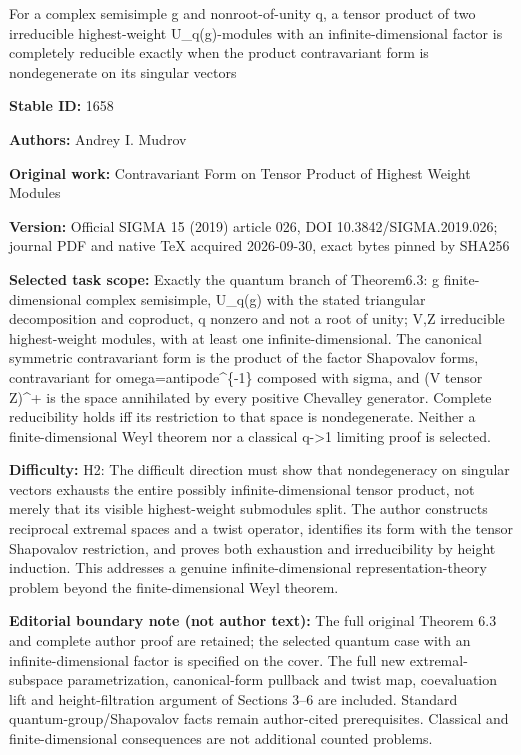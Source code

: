 \documentclass[11pt]{article}
\numberwithin{equation}{section}
\begin{document}
\begin{center}\Large For a complex semisimple g and nonroot-of-unity q, a tensor product of two irreducible highest-weight U\_q(g)-modules with an infinite-dimensional factor is completely reducible exactly when the product contravariant form is nondegenerate on its singular vectors\end{center}
\noindent\textbf{Stable ID:} 1658\par
\noindent\textbf{Authors:} Andrey I. Mudrov\par
\noindent\textbf{Original work:} Contravariant Form on Tensor Product of Highest Weight Modules\par
\noindent\textbf{Version:} Official SIGMA 15 (2019) article 026, DOI 10.3842/SIGMA.2019.026; journal PDF and native TeX acquired 2026-09-30, exact bytes pinned by SHA256\par
\noindent\textbf{Selected task scope:} Exactly the quantum branch of Theorem6.3: g finite-dimensional complex semisimple, U\_q(g) with the stated triangular decomposition and coproduct, q nonzero and not a root of unity; V,Z irreducible highest-weight modules, with at least one infinite-dimensional. The canonical symmetric contravariant form is the product of the factor Shapovalov forms, contravariant for omega=antipode\textasciicircum{}\{-1\} composed with sigma, and (V tensor Z)\textasciicircum{}+ is the space annihilated by every positive Chevalley generator. Complete reducibility holds iff its restriction to that space is nondegenerate. Neither a finite-dimensional Weyl theorem nor a classical q->1 limiting proof is selected.\par
\noindent\textbf{Difficulty:} H2: The difficult direction must show that nondegeneracy on singular vectors exhausts the entire possibly infinite-dimensional tensor product, not merely that its visible highest-weight submodules split. The author constructs reciprocal extremal spaces and a twist operator, identifies its form with the tensor Shapovalov restriction, and proves both exhaustion and irreducibility by height induction. This addresses a genuine infinite-dimensional representation-theory problem beyond the finite-dimensional Weyl theorem.\par
\noindent\textbf{Editorial boundary note (not author text):} The full original Theorem 6.3 and complete author proof are retained; the selected quantum case with an infinite-dimensional factor is specified on the cover. The full new extremal-subspace parametrization, canonical-form pullback and twist map, coevaluation lift and height-filtration argument of Sections 3–6 are included. Standard quantum-group/Shapovalov facts remain author-cited prerequisites. Classical and finite-dimensional consequences are not additional counted problems.\par
\end{document}
